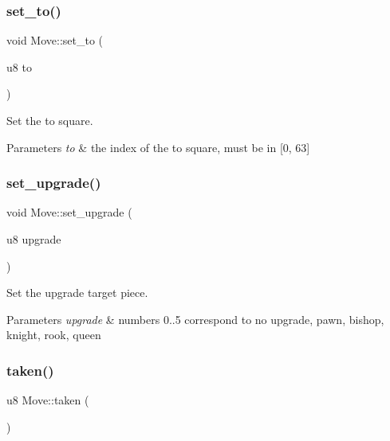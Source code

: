 \subsubsection{\texorpdfstring{set\+\_\+to()}{set\_to()}}
{\footnotesize\ttfamily void Move\+::set\+\_\+to (\begin{DoxyParamCaption}\item[{u8}]{to }\end{DoxyParamCaption})\hspace{0.3cm}{\ttfamily [inline]}}



Set the to square. 


\begin{DoxyParams}{Parameters}
{\em to} & the index of the to square, must be in \mbox{[}0, 63\mbox{]} \\
\hline
\end{DoxyParams}
\mbox{\label{structMove_a9c40bb72c8a2e4d979880e8476dae31d}} 
\subsubsection{\texorpdfstring{set\+\_\+upgrade()}{set\_upgrade()}}
{\footnotesize\ttfamily void Move\+::set\+\_\+upgrade (\begin{DoxyParamCaption}\item[{u8}]{upgrade }\end{DoxyParamCaption})\hspace{0.3cm}{\ttfamily [inline]}}



Set the upgrade target piece. 


\begin{DoxyParams}{Parameters}
{\em upgrade} & numbers 0..5 correspond to no upgrade, pawn, bishop, knight, rook, queen \\
\hline
\end{DoxyParams}
\mbox{\label{structMove_a550cdb71500d27afbd3d480b6c7f0b41}} 
\subsubsection{\texorpdfstring{taken()}{taken()}}
{\footnotesize\ttfamily u8 Move\+::taken (\begin{DoxyParamCaption}{ }\end{DoxyParamCaption})\hspace{0.3cm}{\ttfamily [inline]}}



